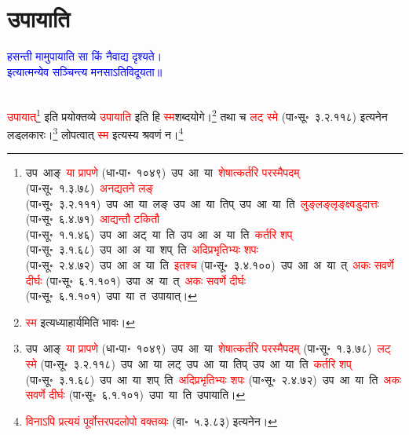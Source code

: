 \section[उपायाति]{उपायाति}
\centering\textcolor{blue}{हसन्ती मामुपायाति सा किं नैवाद्य दृश्यते।\nopagebreak\\
इत्यात्मन्येव सञ्चिन्त्य मनसाऽतिविदूयता॥}\nopagebreak\\
\\
\fontsize{14}{21}\selectfont\begin{sloppypar}\justifying\noindent\hspace{10mm} \textcolor{red}{उपायात्}\footnote{उप~आङ्~\textcolor{red}{या प्रापणे} (धा॰पा॰~१०४९)~\arrow उप~आ~या~\arrow \textcolor{red}{शेषात्कर्तरि परस्मैपदम्} (पा॰सू॰~१.३.७८)~\arrow \textcolor{red}{अनद्यतने लङ्} (पा॰सू॰~३.२.१११)~\arrow उप~आ~या~लङ्~\arrow उप~आ~या~तिप्~\arrow उप~आ~या~ति~\arrow \textcolor{red}{लुङ्लङ्लृङ्क्ष्वडुदात्तः} (पा॰सू॰~६.४.७१)~\arrow \textcolor{red}{आद्यन्तौ टकितौ} (पा॰सू॰~१.१.४६)~\arrow उप~आ~अट्~या~ति~\arrow उप~आ~अ~या~ति~\arrow \textcolor{red}{कर्तरि शप्‌} (पा॰सू॰~३.१.६८)~\arrow उप~आ~अ~या~शप्~ति~\arrow \textcolor{red}{अदिप्रभृतिभ्यः शपः} (पा॰सू॰~२.४.७२)~\arrow उप~आ~अ~या~ति~\arrow \textcolor{red}{इतश्च} (पा॰सू॰~३.४.१००)~\arrow उप~आ~अ~या~त्~\arrow \textcolor{red}{अकः सवर्णे दीर्घः} (पा॰सू॰~६.१.१०१)~\arrow उपा~अ~या~त्~\arrow \textcolor{red}{अकः सवर्णे दीर्घः} (पा॰सू॰~६.१.१०१)~\arrow उपा~या~त~\arrow उपायात्।} इति प्रयोक्तव्ये \textcolor{red}{उपायाति} इति हि \textcolor{red}{स्म}\-शब्द\-योगे।\footnote{\textcolor{red}{स्म} इत्यध्याहार्यमिति भावः।} तथा च \textcolor{red}{लट् स्मे} (पा॰सू॰~३.२.११८) इत्यनेन लड्लकारः।\footnote{उप~आङ्~\textcolor{red}{या प्रापणे} (धा॰पा॰~१०४९)~\arrow उप~आ~या~\arrow \textcolor{red}{शेषात्कर्तरि परस्मैपदम्} (पा॰सू॰~१.३.७८)~\arrow \textcolor{red}{लट् स्मे} (पा॰सू॰~३.२.११८)~\arrow उप~आ~या~लट्~\arrow उप~आ~या~तिप्~\arrow उप~आ~या~ति~\arrow \textcolor{red}{कर्तरि शप्‌} (पा॰सू॰~३.१.६८)~\arrow उप~आ~या~शप्~ति~\arrow \textcolor{red}{अदिप्रभृतिभ्यः शपः} (पा॰सू॰~२.४.७२)~\arrow उप~आ~या~ति~\arrow \textcolor{red}{अकः सवर्णे दीर्घः} (पा॰सू॰~६.१.१०१)~\arrow उपा~या~ति~\arrow उपायाति।} लोपत्वात् \textcolor{red}{स्म} इत्यस्य श्रवणं न।\footnote{\textcolor{red}{विनाऽपि प्रत्ययं पूर्वोत्तर\-पद\-लोपो वक्तव्यः} (वा॰~५.३.८३) इत्यनेन।}\end{sloppypar}
